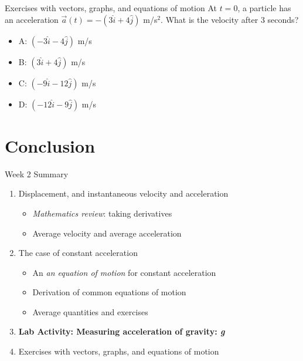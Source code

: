 \documentclass{beamer}
\begin{document}
\begin{frame}{Exercises with vectors, graphs, and equations of motion}
At $t=0$, a particle has an acceleration $\vec{a}(t) = -(3\hat{i}+4\hat{j})$ m/s$^2$.  What is the velocity after 3 seconds?\\
\begin{itemize}
\item A: $(-3\hat{i}-4\hat{j})$ m/s
\item B: $(3\hat{i}+4\hat{j})$ m/s
\item C: $(-9\hat{i}-12\hat{j})$ m/s
\item D: $(-12\hat{i}-9\hat{j})$ m/s
\end{itemize}
\end{frame}

\section{Conclusion}

\begin{frame}{Week 2 Summary}
\begin{enumerate}
\item Displacement, and instantaneous velocity and acceleration
\begin{itemize}
\item \textit{Mathematics review}: taking derivatives
\item Average velocity and average acceleration
\end{itemize}
\item The case of constant acceleration
\begin{itemize}
\item An \textit{an equation of motion} for constant acceleration
\item Derivation of \alert{common equations of motion}
\item Average quantities and exercises
\end{itemize}
\item \textbf{Lab Activity: Measuring acceleration of gravity: \textit{g}}
\item Exercises with vectors, graphs, and equations of motion
\end{enumerate}
\end{frame}
\end{document}
